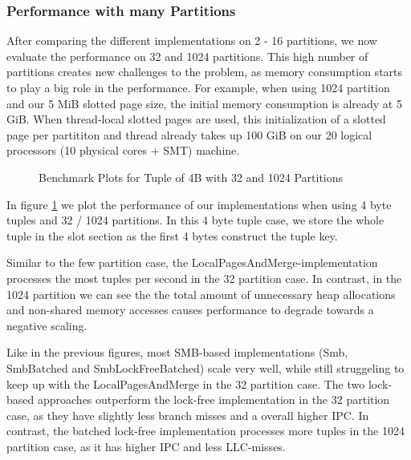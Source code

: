 \subsubsection{Performance with many Partitions}
After comparing the different implementations on 2 - 16 partitions, we now evaluate the performance on 32 and 1024 partitions.
This high number of partitions creates new challenges to the problem, as memory consumption starts to play a big role in the performance.
For example, when using 1024 partition and our 5 MiB slotted page size, the initial memory consumption is already at 5 GiB.
When thread-local slotted pages are used, this initialization of a slotted page per partititon and thread already takes up 100 GiB on our 20 logical processors (10 physical cores + SMT) machine.

\begin{figure}[h]
  \centering
  \begin{subfigure}{.49\textwidth}
    \centering
    \resizebox{\linewidth}{!}{}
  \end{subfigure}
  \begin{subfigure}{.49\textwidth}
    \centering
    \resizebox{\linewidth}{!}{}
  \end{subfigure}
  \begin{subfigure}{\textwidth}
    \centering
    \resizebox{\linewidth}{!}{}
  \end{subfigure}
  \caption[Shuffle Benchmark Plots for Tuple of 4B with 32 and 1024 Partitions]{Benchmark Plots for Tuple of 4B with 32 and 1024 Partitions}
  \label{plot-shuffle-4B-32-1024}
\end{figure}

In figure \ref{plot-shuffle-4B-32-1024} we plot the performance of our implementations when using 4 byte tuples and 32 / 1024 partitions.
In this 4 byte tuple case, we store the whole tuple in the slot section as the first 4 bytes construct the tuple key.

Similar to the few partition case, the LocalPagesAndMerge-implementation processes the most tuples per second in the 32 partition case.
In contrast, in the 1024 partition we can see the the total amount of unnecessary heap allocations and non-shared memory accesses causes performance to degrade towards a negative scaling.

Like in the previous figures, most \ac{SMB}-based implementations (Smb, SmbBatched and SmbLockFreeBatched) scale very well, while still struggeling to keep up with the LocalPagesAndMerge in the 32 partition case.
The two lock-based approaches outperform the lock-free implementation in the 32 partition case, as they have slightly less branch misses and a overall higher \ac{IPC}.
In contrast, the batched lock-free implementation processes more tuples in the 1024 partition case, as it has higher \ac{IPC} and less \ac{LLC}-misses.

